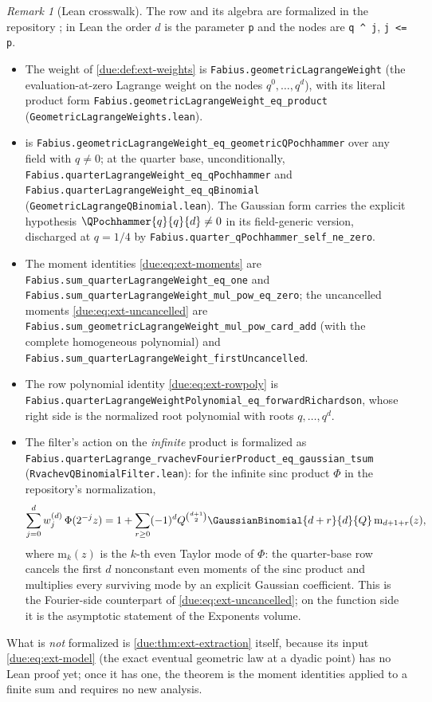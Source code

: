 \documentclass[11pt,oneside]{article}
\theoremstyle{plain}
\theoremstyle{definition}
\theoremstyle{remark}
\newtheorem{remark}[theorem]{Remark}
\newcommand{\Qq}{Q}                                         %
\newcommand{\Wrow}[2]{w^{(#1)}_{#2}}                        %
\begin{document}
\begin{remark}[Lean crosswalk]
\label{due:rmk:ext-lean}
The row and its algebra are formalized in the repository
\cite{proveit-primary}; in Lean the order $d$ is the parameter \texttt{p} and
the nodes are \texttt{q\,\textasciicircum{}\,j}, \texttt{j <= p}.
\begin{itemize}
\item The weight of \cref{due:def:ext-weights} is
 \nolinkurl{Fabius.geometricLagrangeWeight} (the evaluation-at-zero Lagrange
 weight on the nodes $q^{0},\ldots,q^{d}$), with its literal product form
 \nolinkurl{Fabius.geometricLagrangeWeight_eq_product}
 (\nolinkurl{GeometricLagrangeWeights.lean}).
\item {} is
 \nolinkurl{Fabius.geometricLagrangeWeight_eq_geometricQPochhammer} over any
 field with $q\ne0$; at the quarter base, unconditionally,
 \nolinkurl{Fabius.quarterLagrangeWeight_eq_qPochhammer} and
 \nolinkurl{Fabius.quarterLagrangeWeight_eq_qBinomial}
 (\nolinkurl{GeometricLagrangeQBinomial.lean}).  The Gaussian form carries
 the explicit hypothesis $\QPochhammer{q}{q}{d}\ne0$ in its field-generic
 version, discharged at $q=1/4$ by
 \nolinkurl{Fabius.quarter_qPochhammer_self_ne_zero}.
\item The moment identities \cref{due:eq:ext-moments} are
 \nolinkurl{Fabius.sum_quarterLagrangeWeight_eq_one} and
 \nolinkurl{Fabius.sum_quarterLagrangeWeight_mul_pow_eq_zero}; the
 uncancelled moments \cref{due:eq:ext-uncancelled} are
 \nolinkurl{Fabius.sum_geometricLagrangeWeight_mul_pow_card_add} (with the
 complete homogeneous polynomial) and
 \nolinkurl{Fabius.sum_quarterLagrangeWeight_firstUncancelled}.
\item The row polynomial identity \cref{due:eq:ext-rowpoly} is
 \nolinkurl{Fabius.quarterLagrangeWeightPolynomial_eq_forwardRichardson},
 whose right side is the normalized root polynomial with roots
 $q,\ldots,q^{d}$.
\item The filter's action on the \emph{infinite} product is formalized as
 \nolinkurl{Fabius.quarterLagrange_rvachevFourierProduct_eq_gaussian_tsum}
 (\nolinkurl{RvachevQBinomialFilter.lean}): for the infinite sinc product
 $\Phi$ in the repository's normalization,
 \[
  \sum_{j=0}^{d}\Wrow{d}{j}\,\Phi(2^{-j}z)
  =1+\sum_{r\ge0}(-1)^{d}\Qq^{\binom{d+1}{2}}
  \GaussianBinomial{d+r}{d}{\Qq}\,\mathrm{m}_{d+1+r}(z),
 \]
 where $\mathrm m_{k}(z)$ is the $k$-th even Taylor mode of $\Phi$: the
 quarter-base row cancels the first $d$ nonconstant even moments of the sinc
 product and multiplies every surviving mode by an explicit Gaussian
 coefficient.  This is the Fourier-side counterpart of
 \cref{due:eq:ext-uncancelled}; on the function side it is the asymptotic
 statement of the Exponents volume.
\end{itemize}
What is \emph{not} formalized is \cref{due:thm:ext-extraction} itself,
because its input \cref{due:eq:ext-model} (the exact eventual geometric law
at a dyadic point) has no Lean proof yet; once it has one, the theorem is the
moment identities applied to a finite sum and requires no new analysis.
\end{remark}
\end{document}
